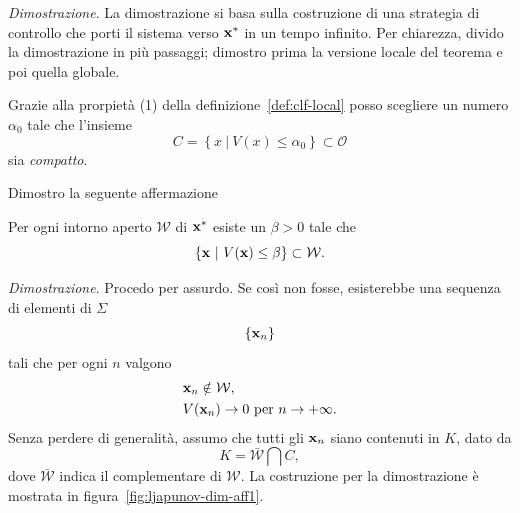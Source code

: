 \emph{Dimostrazione}.
La dimostrazione si basa sulla costruzione di una strategia di
controllo che porti il sistema verso $\mathbf{x}^*$ in un tempo infinito.
Per chiarezza, divido la dimostrazione in più passaggi; dimostro prima la versione locale
del teorema e poi quella globale.
\begin{steps}
    \item Grazie alla prorpietà (1) della definizione~\ref{def:clf-local}
    posso scegliere un numero $\alpha_0$ tale che l'insieme
    \begin{equation}
        C = \left\{ x\ |\ V(x) \leq \alpha_0 \right\} \subset \mathcal O
        \label{eq:alpha_0}
    \end{equation}
    sia \emph{compatto}.

    Dimostro la seguente affermazione

    \begin{aff}
        Per ogni intorno aperto $\mathcal W$ di $\mathbf{x}^*$ esiste
        un $\beta > 0$ tale che
        \begin{equation*}
            \{\mathbf{x}\ |\ V(\mathbf{x}) \leq \beta\} \subset \mathcal W.
        \end{equation*}
    \end{aff}

    \emph{Dimostrazione}.
    Procedo per assurdo.
    Se così non fosse, esisterebbe una sequenza di elementi di $\Sigma$
    \begin{equation*}
    \{\mathbf{x}_n\}
    \end{equation*}
    tali che per ogni $n$
    valgono
    \begin{align*}
        &\mathbf{x}_n \notin \mathcal W, \\
        &V(\mathbf{x}_n) \to 0 \text{ per } n \to +\infty.
    \end{align*}
    Senza perdere di generalità, assumo che tutti gli $\mathbf{x}_n$
    siano contenuti in $K$, dato da
    \begin{equation*}
        K = \bar{\mathcal W} \bigcap C,
    \end{equation*}
    dove $\bar{\mathcal W}$ indica il complementare di $\mathcal W$.
    La costruzione per la dimostrazione è mostrata in figura~\ref{fig:ljapunov-dim-aff1}.


\end{steps}
